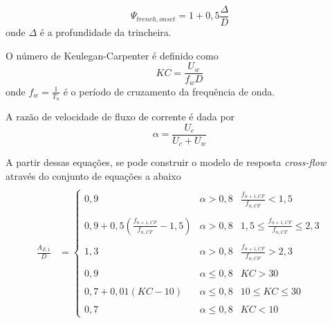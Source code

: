 \begin{equation}
\label{eq:viv-Psitren}
\Psi_{\mathit{trench}, \mathit{onset}} = 1 + 0,5\frac{\Delta}{D}
\end{equation}
onde $\Delta$ é a profundidade da trincheira.

O número de Keulegan-Carpenter é definido como
\begin{equation}
\label{eq:viv-KC}
\mathit{KC} = \frac{U_w}{f_w D}
\end{equation}
onde $f_w = \frac{1}{T_u}$ é o período de cruzamento da frequência de onda.

A razão de velocidade de fluxo de corrente é dada por
\begin{equation}
\label{eq:viv-alfa}
\alpha = \frac{U_c}{U_c + U_w}
\end{equation}

A partir dessas equações, se pode construir o modelo de resposta \textit{cross-flow} através do conjunto de equações a abaixo
\begin{equation}
\label{eq:viv-azdj}
\begin{aligned}
\\
\frac{A_{Z,1}}{D} &=
\left\{
\begin{matrix}
0,9                                                      & \alpha > 0,8   &         \frac{f_{n+1,CF}}{f_{n,CF}} <   1,5 \\
\\
0,9 + 0,5 \left(\frac{f_{n+1,CF}}{f_{n,CF}} - 1,5\right) & \alpha > 0,8   & 1,5 \le \frac{f_{n+1,CF}}{f_{n,CF}} \le 2,3 \\
\\
1,3                                                      & \alpha > 0,8   &         \frac{f_{n+1,CF}}{f_{n,CF}} >   2,3 \\
\\
0,9                                                      & \alpha \le 0,8 &        \mathit{KC} >   30 \\
\\
0,7 + 0,01 (\mathit{KC} -10)                             & \alpha \le 0,8 & 10 \le \mathit{KC} \le 30 \\
\\
0,7                                                      & \alpha \le 0,8 &        \mathit{KC} <   10
\end{matrix}
\right.\\
\end{aligned}
\end{equation}

